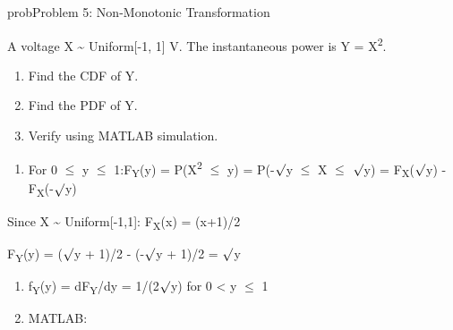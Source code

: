 \begin{PSbox}[unbreakable]{prob}{Problem 5: Non-Monotonic Transformation}

A voltage X \textasciitilde{} Uniform[-1, 1] V. The instantaneous power is Y = X\textsuperscript{2}.

\begin{enumerate}
\def\labelenumi{(\alph{enumi})}
\tightlist
\item
  Find the CDF of Y.
\item
  Find the PDF of Y.
\item
  Verify using MATLAB simulation.
\end{enumerate}

\PSsolution{} 

\begin{enumerate}
\def\labelenumi{(\alph{enumi})}
\tightlist
\item
  For 0 \ensuremath{\le} y \ensuremath{\le} 1:\PSbr{}F\textsubscript{Y}(y) = P(X\textsuperscript{2} \ensuremath{\le} y) = P(-\ensuremath{\surd}y \ensuremath{\le} X \ensuremath{\le} \ensuremath{\surd}y) = F\textsubscript{X}(\ensuremath{\surd}y) - F\textsubscript{X}(-\ensuremath{\surd}y)
\end{enumerate}

Since X \textasciitilde{} Uniform[-1,1]: F\textsubscript{X}(x) = (x+1)/2

F\textsubscript{Y}(y) = (\ensuremath{\surd}y + 1)/2 - (-\ensuremath{\surd}y + 1)/2 = \ensuremath{\surd}y

\begin{enumerate}
\def\labelenumi{(\alph{enumi})}
\setcounter{enumi}{1}
\item
  f\textsubscript{Y}(y) = dF\textsubscript{Y}/dy = 1/(2\ensuremath{\surd}y) for 0 \textless{} y \ensuremath{\le} 1
\item
  MATLAB:
\end{enumerate}



\end{PSbox}
